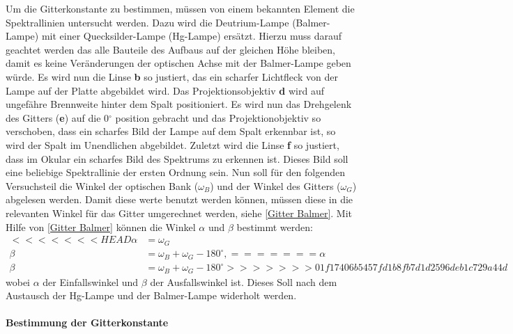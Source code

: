 Um die Gitterkonstante zu bestimmen, müssen von einem bekannten Element die Spektrallinien untersucht werden. 
Dazu wird die Deutrium-Lampe (Balmer-Lampe) mit einer Quecksilder-Lampe (Hg-Lampe) ersätzt. 
Hierzu muss darauf geachtet werden das alle Bauteile des Aufbaus auf der gleichen Höhe bleiben, damit es keine Veränderungen der optischen Achse mit der Balmer-Lampe geben würde.
Es wird nun die Linse \textbf{b} so justiert, das ein scharfer Lichtfleck von der Lampe auf der Platte abgebildet wird.
Das Projektionsobjektiv \textbf{d} wird auf ungefähre Brennweite hinter dem Spalt positioniert. 
Es wird nun das Drehgelenk des Gitters (\textbf{e}) auf die 0$^\circ$ position gebracht und das Projektionobjektiv so verschoben, dass ein scharfes Bild der Lampe auf dem Spalt erkennbar ist, so wird der Spalt im Unendlichen abgebildet.
Zuletzt wird die Linse \textbf{f} so justiert, dass im Okular ein scharfes Bild des Spektrums zu erkennen ist. Dieses Bild soll eine beliebige Spektrallinie der ersten Ordnung sein.
Nun soll für den folgenden Versuchsteil die Winkel der optischen Bank ($\omega_B$) und der Winkel des Gitters ($\omega_G$) abgelesen werden.  
Damit diese werte benutzt werden können, müssen diese in die relevanten Winkel für das Gitter umgerechnet werden, siehe \cref{Gitter Balmer}. 
Mit Hilfe von \cref{Gitter Balmer} können die Winkel $\alpha$ und $\beta$ bestimmt werden: 
\begin{align}
<<<<<<< HEAD
    \alpha &= \omega_G \\  \beta &= \omega_B + \omega_G - 180^\circ,
=======
    \alpha &= \omega_G \\  \beta &= \omega_B + \omega_G - 180^\circ 
    \label{Gitter Balmer}
>>>>>>> 01f17406b5457fd1b8fb7d1d2596deb1c729a44d
\end{align}
wobei $\alpha$ der Einfallswinkel und $\beta$ der Ausfallswinkel ist.
Dieses Soll nach dem Austausch der Hg-Lampe und der Balmer-Lampe widerholt werden. 


\paragraph{Bestimmung der Gitterkonstante}

